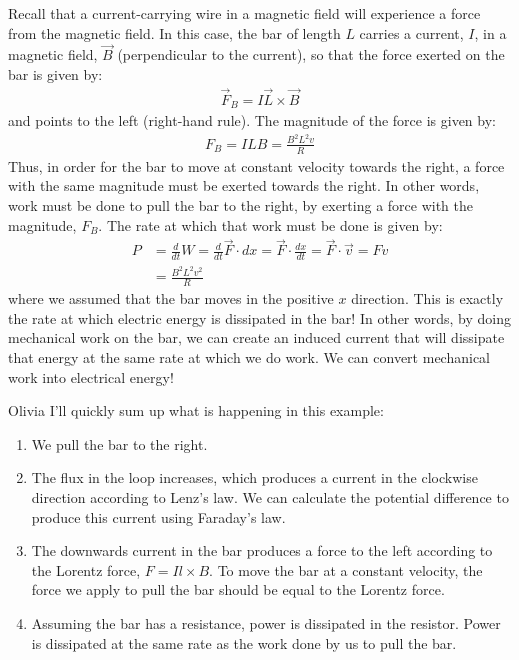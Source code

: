 Recall that a current-carrying wire in a magnetic field will experience a force from the magnetic field. In this case, the bar of length $L$ carries a current, $I$, in a magnetic field, $\vec B$ (perpendicular to the current), so that the force exerted on the bar is given by:
\begin{align*}
\vec F_B = I \vec L \times \vec B
\end{align*}
and points to the left (right-hand rule). The magnitude of the force is given by:
\begin{align*}
F_B = ILB = \frac{B^2L^2v}{R}
\end{align*}
Thus, in order for the bar to move at constant velocity towards the right, a force with the same magnitude must be exerted towards the right. In other words, work must be done to pull the bar to the right, by exerting a force with the magnitude, $F_B$. The rate at which that work must be done is given by:
\begin{align*}
P &= \frac{d}{dt}W=\frac{d}{dt}\vec F \cdot dx=\vec F\cdot \frac{dx}{dt}=\vec F\cdot \vec v = Fv\\
&=\frac{B^2L^2v^2}{R}
\end{align*}
where we assumed that the bar moves in the positive $x$ direction. This is exactly the rate at which electric energy is dissipated in the bar! In other words, by doing mechanical work on the bar, we can create an induced current that will dissipate that energy at the same rate at which we do work. We can convert mechanical work into electrical energy!

\begin{studentOpinion}{Olivia}
I'll quickly sum up what is happening in this example:
\begin{enumerate}
\item We pull the bar to the right.
\item The flux in the loop increases, which produces a current in the clockwise direction according to Lenz's law. We can calculate the potential difference to produce this current using Faraday's law. 
\item The downwards current in the bar produces a force to the left according to the Lorentz force, $F=Il\times B$. To move the bar at a constant velocity, the force we apply to pull the bar should be equal to the Lorentz force. 
\item Assuming the bar has a resistance, power is dissipated in the resistor. Power is dissipated at the same rate as the work done by us to pull the bar.  
\end{enumerate}
\end{studentOpinion}

